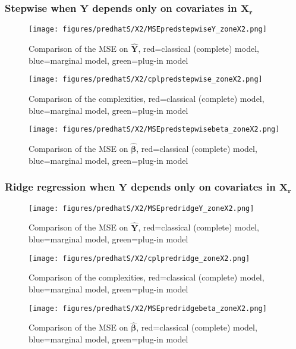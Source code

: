 \documentclass[12pt,a4paper]{report}
\begin{document}
\subsubsection{Stepwise when $\boldsymbol{Y}$ depends only on covariates in $\boldsymbol{X_r}$}

	\begin{figure}[h!]
	\centering
		  \texttt{[image: figures/predhatS/X2/MSEpredstepwiseY\_zoneX2.png]}
		\caption{Comparison of the MSE on $\hat{\boldsymbol{Y}}$, red=classical (complete) model, blue=marginal model, green=plug-in model}\label{MSEpredstepwiseY_zoneX2}
	\end{figure}
	\begin{figure}[h!]
	\centering
		  \texttt{[image: figures/predhatS/X2/cplpredstepwise\_zoneX2.png]}
		\caption{Comparison of the complexities, red=classical (complete) model, blue=marginal model, green=plug-in model}\label{cplpredstepwise_zoneX2}
	\end{figure}
	\begin{figure}[h!]
	\centering
		  \texttt{[image: figures/predhatS/X2/MSEpredstepwisebeta\_zoneX2.png]}
		\caption{Comparison of the MSE on $\hat{\boldsymbol{\beta}}$, red=classical (complete) model, blue=marginal model, green=plug-in model}\label{MSEpredstepwisebeta_zoneX2}
	\end{figure}
	\FloatBarrier
\newpage
\subsubsection{Ridge regression when $\boldsymbol{Y}$ depends only on covariates in $\boldsymbol{X_r}$}

\begin{figure}[h!]
	\centering
		  \texttt{[image: figures/predhatS/X2/MSEpredridgeY\_zoneX2.png]}
		\caption{Comparison of the MSE on $\hat{\boldsymbol{Y}}$, red=classical (complete) model, blue=marginal model, green=plug-in model}\label{MSEpredridgeY_zoneX2}
	\end{figure}
	\begin{figure}[h!]
	\centering
		  \texttt{[image: figures/predhatS/X2/cplpredridge\_zoneX2.png]}
		\caption{Comparison of the complexities, red=classical (complete) model, blue=marginal model, green=plug-in model}\label{cplpredridge_zoneX2}
	\end{figure}
	\begin{figure}[h!]
	\centering
		  \texttt{[image: figures/predhatS/X2/MSEpredridgebeta\_zoneX2.png]}
		\caption{Comparison of the MSE on $\hat{\boldsymbol{\beta}}$, red=classical (complete) model, blue=marginal model, green=plug-in model}\label{MSEpredridgebeta_zoneX2}
	\end{figure}
	\FloatBarrier
\end{document}
